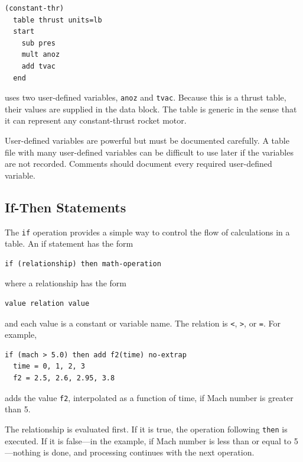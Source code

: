 \begin{lstlisting}[style=taosmanual]
(constant-thr)
  table thrust units=lb
  start
    sub pres
    mult anoz
    add tvac
  end
\end{lstlisting}

uses two user-defined variables, \texttt{anoz} and \texttt{tvac}. Because this is a
thrust table, their values are supplied in the  data block. The
table is generic in the sense that it can represent any constant-thrust rocket motor.

User-defined variables are powerful but must be documented carefully. A table file
with many user-defined variables can be difficult to use later if the variables are not
recorded. Comments should document every required user-defined variable.

\subsection{If-Then Statements}\label{sec:if-then-statements}

The \texttt{if} operation provides a simple way to control the flow of calculations in
a table. An if statement has the form

\begin{lstlisting}[style=taosmanual]
if (relationship) then math-operation
\end{lstlisting}

where a relationship has the form

\begin{lstlisting}[style=taosmanual]
value relation value
\end{lstlisting}

and each value is a constant or variable name. The relation is \texttt{<},
\texttt{>}, or \texttt{=}. For example,

\begin{lstlisting}[style=taosmanual]
if (mach > 5.0) then add f2(time) no-extrap
  time = 0, 1, 2, 3
  f2 = 2.5, 2.6, 2.95, 3.8
\end{lstlisting}

adds the value \texttt{f2}, interpolated as a function of time, if Mach number is
greater than 5.

The relationship is evaluated first. If it is true, the operation following
\texttt{then} is executed. If it is false---in the example, if Mach number is less than
or equal to 5---nothing is done, and processing continues with the next operation.

